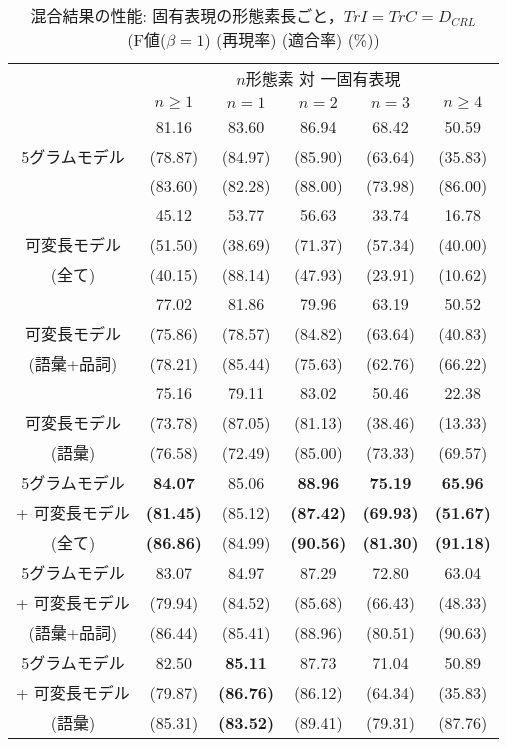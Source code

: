 \begin{table*}
\begin{center}
\caption{混合結果の性能: 固有表現の形態素長ごと，$TrI=TrC=D_{CRL}$\\ 
(F値($\beta=1$) (再現率) (適合率) (\%))}
\label{tab:res-len}
\begin{tabular}{|c||c||c|c|c|c|} \hline
        &                  \multicolumn{5}{c|}{$n$形態素 対 一固有表現} \\ \cline{2-6}
        &                $n\geq 1$ & $n=1$ & $n=2$ & $n=3$ & $n\geq 4$  \\ \hline\hline
	& 		
	 81.16 & 83.60 &	86.94 & 68.42 &	50.59 \\ 
5グラムモデル  	& (78.87) & (84.97) &	(85.90) & (63.64) &	(35.83) \\ 
	& (83.60) & (82.28) &	(88.00) & (73.98) &	(86.00) \\ \hline
	& 
	  	45.12 & 53.77 &	56.63 & 33.74 &	16.78 \\ 
可変長モデル & (51.50) & (38.69) & (71.37) & (57.34) & (40.00) \\ 
(全て)	& (40.15) & (88.14) & (47.93) & (23.91) & (10.62) \\ \hline
	&  	77.02 & 81.86 &	79.96 & 63.19 &	50.52 \\ 
可変長モデル 	 & (75.86) & (78.57) &	(84.82) & (63.64) &	(40.83) \\
(語彙+品詞) & (78.21) & (85.44) &	(75.63) & (62.76) &	(66.22) \\ \hline
	& 75.16 & 79.11 &	83.02 & 50.46 &	22.38 \\ 
可変長モデル 	& (73.78) & (87.05) & (81.13) & (38.46) & (13.33) \\ 
(語彙)  	& (76.58) & (72.49) & (85.00) & (73.33) & (69.57) \\ \hline\hline
5グラムモデル & {\bf 84.07} & 85.06 & {\bf 88.96} & {\bf 75.19} &	{\bf 65.96} \\ 
+ 可変長モデル	& {\bf (81.45)} & (85.12) & {\bf (87.42)} & {\bf (69.93)} & {\bf (51.67)} \\ 
 (全て)  	& {\bf (86.86)} & (84.99) & {\bf (90.56)} & {\bf (81.30)} & {\bf (91.18)} \\ \hline
5グラムモデル & 83.07 & 84.97 & 87.29 & 72.80 &	63.04 \\ 
+ 可変長モデル 
	& (79.94) & (84.52) & (85.68) & (66.43) & (48.33) \\ 	
(語彙+品詞)  	& (86.44) & (85.41) & (88.96) & (80.51) & (90.63) \\ 	\hline
5グラムモデル & 
	82.50 & {\bf 85.11} &	87.73 & 71.04 &	50.89 \\ 
+ 可変長モデル 
	& (79.87) & {\bf (86.76)} & (86.12) & (64.34) & (35.83) \\ 
(語彙)    & (85.31) & {\bf (83.52)} & (89.41) & (79.31) & (87.76) \\ \hline
\end{tabular}
\end{center}
\end{table*}



